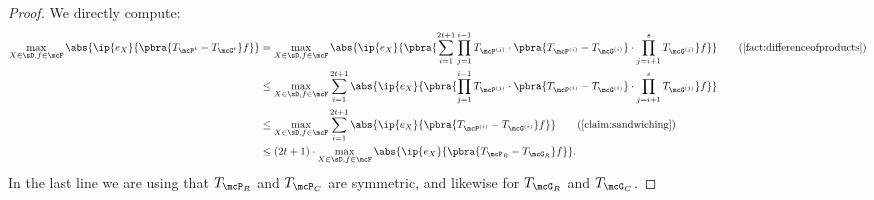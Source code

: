 \begin{proof}We directly compute:
    \begin{align*}
        \max_{X \in \sD, f \in \mcF} \abs{\ip{e_X}{\pbra{T_{\mcP^t} - T_{\mcG^t}} f}}
        &= \max_{X \in \sD, f \in \mcF} \abs{\ip{e_X}{\pbra{\sum_{i=1}^{2t+1} \prod_{j=1}^{i-1} T_{\mcP^{(j)}} \cdot \pbra{T_{\mcP^{(i)}} - T_{\mcG^{(i)}}} \cdot \prod_{j = i+1}^s T_{\mcG^{(j)}}} f}} \tag{\Cref{fact:differenceofproducts}}\\
        &\leq \max_{X \in \sD, f \in \mcF} \sum_{i=1}^{2t+1} \abs{\ip{e_X}{\pbra{ \prod_{j=1}^{i-1} T_{\mcP^{(j)}} \cdot \pbra{T_{\mcP^{(i)}} - T_{\mcG^{(i)}}} \cdot \prod_{j = i+1}^s T_{\mcG^{(j)}}} f}}\\
        &\leq \max_{X \in \sD, f \in \mcF} \sum_{i=1}^{2t+1} \abs{\ip{e_X}{\pbra{T_{\mcP^{(i)}} - T_{\mcG^{(i)}}} f}} \tag{\Cref{claim:sandwiching}}\\
        &\leq (2t+1) \cdot \max_{X \in \sD, f \in \mcF} \abs{\ip{e_X}{\pbra{T_{\mcP_R} - T_{\mcG_R}} f}}.
    \end{align*}
    In the last line we are using that $T_{\mcP_R}$ and $T_{\mcP_C}$ are symmetric, and likewise for $T_{\mcG_R}$ and $T_{\mcG_C}$.
\end{proof}

